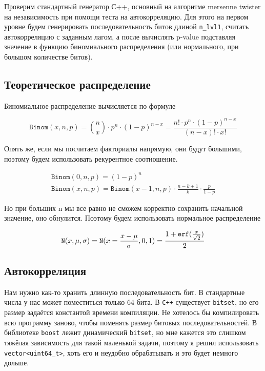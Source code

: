 \documentclass[12pt]{extarticle}
\begin{document}
Проверим стандартный генератор С++, основный на алгоритме mersenne twister на независимость при помощи теста на автокорреляцию. Для этого на первом уровне будем генерировать последовательность битов длиной \texttt{n\_lvl1}, считать автокорреляцию с заданным лагом, а после вычислять p-value подставляя значение в функцию биномиального распределения (или нормального, при большом количестве битов).

\subsection{Теоретическое распределение}

Биномиальное распределение вычисляется по формуле

\begin{equation}
\texttt{Binom}(x, n, p) = \binom{n}{x} \cdot p^n \cdot (1 - p)^{n-x} = \frac{n! \cdot p^n \cdot (1 - p)^{n-x}}{(n-x)! \cdot x!}
\end{equation}

Опять же, если мы посчитаем факториалы напрямую, они будут большими, поэтому будем использовать рекурентное соотношение.

\begin{equation}
\begin{gathered}
    \texttt{Binom}(0, n, p) = (1-p)^n \\
    \texttt{Binom}(x, n, p) = \texttt{Binom}(x - 1, n, p) \cdot \frac{n - k + 1}{k} \cdot \frac{p}{1-p}
\end{gathered}
\end{equation}

Но при больших n мы все равно не сможем корректно сохранить начальной значение, оно обнулится. Поэтому будем использовать нормальное распределение

\begin{equation}
    \texttt{N}(x, \mu, \sigma) = \texttt{N}(x=\frac{x -  \mu}{\sigma}, 0, 1) = \frac{1 + \texttt{erf}(\frac{x}{\sqrt{2}})}{2} \\
\end{equation}

\subsection{Автокорреляция}

Нам нужно как-то хранить длинную последовательность бит. В стандартные числа у нас может поместиться только 64 бита. В \texttt{C++} существует \texttt{bitset}, но его размер задаётся константой времени компиляции. Не хотелось бы компилировать всю программу заново, чтобы поменять размер битовых последовательностей. В библиотеке \texttt{boost} лежит динамический \texttt{bitset}, но мне кажется это слишком тяжёлая зависимость для такой маленькой задачи, поэтому я решил использовать \texttt{vector<uint64\_t>}, хоть его и неудобно обрабатывать и это будет немного дольше.
\end{document}
